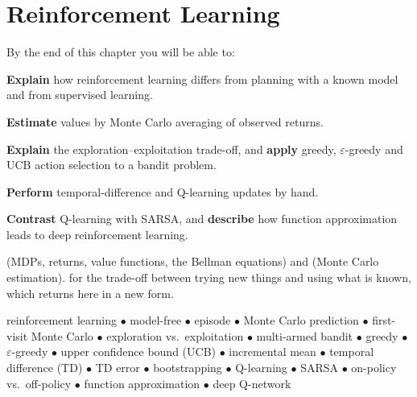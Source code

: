 \chapter{Reinforcement Learning}\label{ch:rl}

\begin{outcomes}
By the end of this chapter you will be able to:
\begin{tight}
  \item \textbf{Explain} how reinforcement learning differs from planning with a
        known model and from supervised learning.
  \item \textbf{Estimate} values by Monte Carlo averaging of observed returns.
  \item \textbf{Explain} the exploration--exploitation trade-off, and \textbf{apply}
        greedy, $\varepsilon$-greedy and UCB action selection to a bandit problem.
  \item \textbf{Perform} temporal-difference and Q-learning updates by hand.
  \item \textbf{Contrast} Q-learning with SARSA, and \textbf{describe} how function
        approximation leads to deep reinforcement learning.
\end{tight}
\end{outcomes}

\begin{prereq}
 (MDPs, returns, value functions, the Bellman equations) and 
(Monte Carlo estimation).  for the trade-off between trying new
things and using what is known, which returns here in a new form.
\end{prereq}

\begin{keyterms}
reinforcement learning $\bullet$ model-free $\bullet$ episode $\bullet$ Monte Carlo
prediction $\bullet$ first-visit Monte Carlo $\bullet$ exploration vs.\ exploitation
$\bullet$ multi-armed bandit $\bullet$ greedy $\bullet$ $\varepsilon$-greedy
$\bullet$ upper confidence bound (UCB) $\bullet$ incremental mean $\bullet$ temporal
difference (TD) $\bullet$ TD error $\bullet$ bootstrapping $\bullet$ Q-learning
$\bullet$ SARSA $\bullet$ on-policy vs.\ off-policy $\bullet$ function
approximation $\bullet$ deep Q-network
\end{keyterms}

